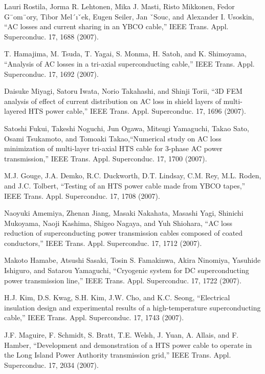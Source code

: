 \noindent [9.191] Lauri Rostila, Jorma R. Lehtonen, Mika J. Masti, Risto Mikkonen, Fedor G¨om¨ory,
Tibor Mel´ıˇek, Eugen Seiler, Jan ˇSouc, and Alexander I. Usoskin, ``AC losses and
current sharing in an YBCO cable,” IEEE Trans. Appl. Superconduc. 17, 1688
(2007).

\noindent [9.192] T. Hamajima, M. Tsuda, T. Yagai, S. Monma, H. Satoh, and K. Shimoyama,
``Analysis of AC losses in a tri-axial superconducting cable,” IEEE Trans. Appl.
Superconduc. 17, 1692 (2007).

\noindent [9.193] Daisuke Miyagi, Satoru Iwata, Norio Takahashi, and Shinji Torii, ``3D FEM analysis
of effect of current distribution on AC loss in shield layers of multi-layered
HTS power cable,” IEEE Trans. Appl. Superconduc. 17, 1696 (2007).

\noindent [9.194] Satoshi Fukui, Takeshi Noguchi, Jun Ogawa, Mitsugi Yamaguchi, Takao Sato,
Osami Tsukamoto, and Tomoaki Takao,``Numerical study on AC loss minimization
of multi-layer tri-axial HTS cable for 3-phase AC power transmission,” IEEE
Trans. Appl. Superconduc. 17, 1700 (2007).

\noindent [9.195] M.J. Gouge, J.A. Demko, R.C. Duckworth, D.T. Lindsay, C.M. Rey, M.L. Roden,
and J.C. Tolbert, ``Testing of an HTS power cable made from YBCO tapes,” IEEE
Trans. Appl. Superconduc. 17, 1708 (2007).

\noindent [9.196] Naoyuki Amemiya, Zhenan Jiang, Masaki Nakahata, Masashi Yagi, Shinichi
Mukoyama, Naoji Kashima, Shigeo Nagaya, and Yuh Shiohara, ``AC loss reduction
of superconducting power transmission cables composed of coated conductors,”
IEEE Trans. Appl. Superconduc. 17, 1712 (2007).

\noindent [9.197] Makoto Hamabe, Atsushi Sasaki, Tosin S. Famakinwa, Akira Ninomiya, Yasuhide
Ishiguro, and Satarou Yamaguchi, ``Cryogenic system for DC superconducting
power transmission line,” IEEE Trans. Appl. Superconduc. 17, 1722 (2007).

\noindent [9.198] H.J. Kim, D.S. Kwag, S.H. Kim, J.W. Cho, and K.C. Seong, ``Electrical insulation
design and experimental results of a high-temperature superconducting cable,”
IEEE Trans. Appl. Superconduc. 17, 1743 (2007).

\noindent [9.199] J.F. Maguire, F. Schmidt, S. Bratt, T.E. Welsh, J. Yuan, A. Allais, and F. Hamber,
``Development and demonstration of a HTS power cable to operate in the
Long Island Power Authority transmission grid,” IEEE Trans. Appl. Superconduc.
17, 2034 (2007).

